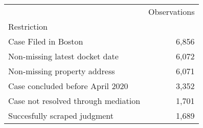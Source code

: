 \begin{tabular}{lr}
\toprule
 & Observations \\
Restriction &  \\
\midrule
Case Filed in Boston & 6,856 \\
Non-missing latest docket date & 6,072 \\
Non-missing property address & 6,071 \\
Case concluded before April 2020 & 3,352 \\
Case not resolved through mediation & 1,701 \\
Succesfully scraped judgment & 1,689 \\
\bottomrule
\end{tabular}
